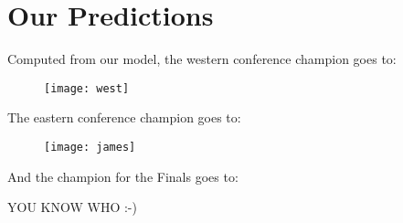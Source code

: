 \section{Our Predictions}

Computed from our model, the western conference champion goes to:
\newpage

\begin{figure}[h]
\centering
\texttt{[image: west]}
\end{figure}

\newpage

The eastern conference champion goes to:

\newpage

\begin{figure}[h]
\centering
\texttt{[image: james]}
\end{figure}

\newpage

And the champion for the Finals goes to: 

\newpage


YOU KNOW WHO :-)

